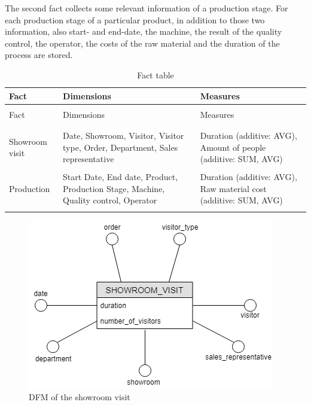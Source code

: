 \documentclass[letterpaper,12pt]{article}
\begin{document}
The second fact collects some relevant information of a production stage. For each production stage of a particular product, in addition to those two information, also start- and end-date, the machine, the result of the quality control, the operator, the costs of the raw material and the duration of the process are stored.

\begingroup
\renewcommand\arraystretch{0.5}
\begin{longtable}{p{3cm}p{6cm}p{4cm}}
        \caption{Fact table} \\
        Fact & Dimensions & Measures \\
        \endfirsthead \\
        Fact & Dimensions & Measures \\
        \endhead \\
        \hline \\
        Showroom visit & Date, Showroom, Visitor, Visitor type, Order, Department, Sales representative & Duration (additive: AVG), Amount of people (additive: SUM, AVG) \\
        \hline \\
        Production & Start Date, End date, Product, Production Stage, Machine, Quality control, Operator & Duration (additive: AVG), Raw material cost (additive: SUM, AVG) \\
        \hline \\
\end{longtable}
\endgroup

\begin{figure}[H] 
        \centering
        \includegraphics[scale=0.65]{../images/DFM_Showroom_Simple.png}
        \caption{
                \label{fig:showroom}  
                DFM of the showroom visit
        }
\end{figure}
\end{document}
